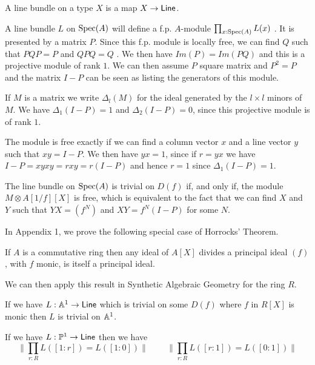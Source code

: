 A line bundle on a type $X$ is a map $X\rightarrow \mathsf{Line}$.


\medskip

 A line bundle $L$ on $\operatorname{Spec}(A)$ will define a f.p. $A$-module $\prod_{x:\operatorname{Spec}(A)}L(x)$ \cite{draft}.
It is presented by a matrix $P$.
Since this f.p. module is locally free, we can find $Q$ such that $PQP = P$ and
$QPQ = Q$ \cite{lombardi-quitte}. We then have $Im(P) = Im(PQ)$ and this is a projective module of rank $1$. We can then assume $P$ square matrix and
$P^2 = P$ and the matrix $I-P$ can  be seen as listing the generators of this module.

If $M$ is a matrix we write $\Delta_l(M)$ for the ideal generated by the $l\times l$ minors of
$M$. We have $\Delta_1(I-P) = 1$ and $\Delta_2(I-P) = 0$, since this projective module is of rank $1$.

The module is free exactly if we can find a column vector $x$ and a line vector $y$ such that
$xy = I-P$. We then have $yx = 1$, since if $r = yx$ we have $I-P = xyxy = rxy = r(I-P)$ and
hence $r = 1$ since $\Delta_1(I-P) = 1$.

\medskip

The line bundle on $\operatorname{Spec}(A)$ is trivial on $D(f)$ if, and only if, the module $M\otimes A[1/f][X]$ is free, which
is equivalent to the fact that we can find $X$ and $Y$ such that $YX = (f^N)$ and $XY = f^N(I-P)$ for some $N$.

In Appendix 1, we prove the following special case of Horrocks' Theorem.

\begin{lemma}%
  If $A$ is a commutative ring
  then any ideal of $A[X]$ divides a principal ideal $(f)$, with $f$ monic, is itself a principal ideal.
\end{lemma}

We can then apply this result in Synthetic Algebraic Geometry for the ring $R$.

\begin{proposition}
  If we have $L:\mathbb{A}^1\rightarrow \mathsf{Line}$ which is trivial on some $D(f)$ where $f$ in $R[X]$ is monic
  then $L$ is trivial on $\mathbb{A}^1$.
\end{proposition}

\begin{corollary}\label{c1}
  If we have $L:\mathbb{P}^1\rightarrow \mathsf{Line}$ then we have
  $$\|{\prod_{r:R}L([1:r]) = L([1:0])}\|\,\,\,\,\,\,\,\,\,\,\,\,\,\|{\prod_{r:R}L([r:1]) = L([0:1])}\|$$
\end{corollary}

